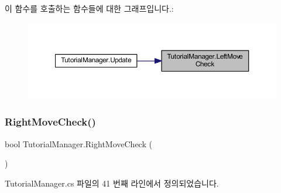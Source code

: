 이 함수를 호출하는 함수들에 대한 그래프입니다.\+:\nopagebreak
\begin{figure}[H]
\begin{center}
\leavevmode
\includegraphics[width=350pt]{d6/d14/class_tutorial_manager_af3e698dd38b14d5d9dd076947bed6f71_icgraph}
\end{center}
\end{figure}
\mbox{\label{class_tutorial_manager_a725025cd876fbd907721145acc30aa90}} 
\subsubsection{\texorpdfstring{RightMoveCheck()}{RightMoveCheck()}}
{\footnotesize\ttfamily bool Tutorial\+Manager.\+Right\+Move\+Check (\begin{DoxyParamCaption}{ }\end{DoxyParamCaption})\hspace{0.3cm}{\ttfamily [private]}}



Tutorial\+Manager.\+cs 파일의 41 번째 라인에서 정의되었습니다.


